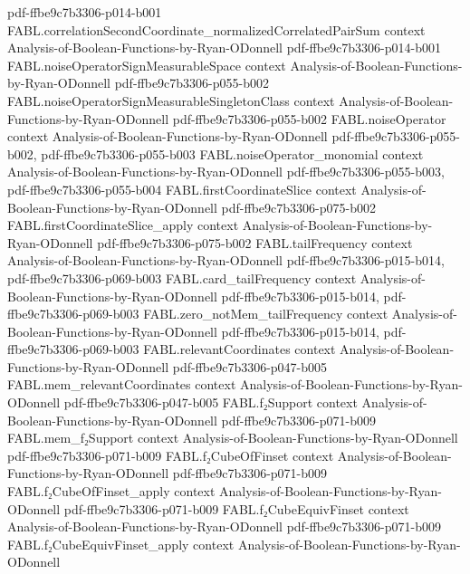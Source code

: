 \begin{theorem}
  {pdf-ffbe9c7b3306-p014-b001}
\proofstep
  {FABL.correlationSecondCoordinate_normalizedCorrelatedPairSum}
  {context}
  {Analysis-of-Boolean-Functions-by-Ryan-ODonnell}
  {pdf-ffbe9c7b3306-p014-b001}
\proofstep
  {FABL.noiseOperatorSignMeasurableSpace}
  {context}
  {Analysis-of-Boolean-Functions-by-Ryan-ODonnell}
  {pdf-ffbe9c7b3306-p055-b002}
\proofstep
  {FABL.noiseOperatorSignMeasurableSingletonClass}
  {context}
  {Analysis-of-Boolean-Functions-by-Ryan-ODonnell}
  {pdf-ffbe9c7b3306-p055-b002}
\proofstep
  {FABL.noiseOperator}
  {context}
  {Analysis-of-Boolean-Functions-by-Ryan-ODonnell}
  {pdf-ffbe9c7b3306-p055-b002,
    pdf-ffbe9c7b3306-p055-b003}
\proofstep
  {FABL.noiseOperator_monomial}
  {context}
  {Analysis-of-Boolean-Functions-by-Ryan-ODonnell}
  {pdf-ffbe9c7b3306-p055-b003,
    pdf-ffbe9c7b3306-p055-b004}
\proofstep
  {FABL.firstCoordinateSlice}
  {context}
  {Analysis-of-Boolean-Functions-by-Ryan-ODonnell}
  {pdf-ffbe9c7b3306-p075-b002}
\proofstep
  {FABL.firstCoordinateSlice_apply}
  {context}
  {Analysis-of-Boolean-Functions-by-Ryan-ODonnell}
  {pdf-ffbe9c7b3306-p075-b002}
\proofstep
  {FABL.tailFrequency}
  {context}
  {Analysis-of-Boolean-Functions-by-Ryan-ODonnell}
  {pdf-ffbe9c7b3306-p015-b014,
    pdf-ffbe9c7b3306-p069-b003}
\proofstep
  {FABL.card_tailFrequency}
  {context}
  {Analysis-of-Boolean-Functions-by-Ryan-ODonnell}
  {pdf-ffbe9c7b3306-p015-b014,
    pdf-ffbe9c7b3306-p069-b003}
\proofstep
  {FABL.zero_notMem_tailFrequency}
  {context}
  {Analysis-of-Boolean-Functions-by-Ryan-ODonnell}
  {pdf-ffbe9c7b3306-p015-b014,
    pdf-ffbe9c7b3306-p069-b003}
\proofstep
  {FABL.relevantCoordinates}
  {context}
  {Analysis-of-Boolean-Functions-by-Ryan-ODonnell}
  {pdf-ffbe9c7b3306-p047-b005}
\proofstep
  {FABL.mem_relevantCoordinates}
  {context}
  {Analysis-of-Boolean-Functions-by-Ryan-ODonnell}
  {pdf-ffbe9c7b3306-p047-b005}
\proofstep
  {FABL.f₂Support}
  {context}
  {Analysis-of-Boolean-Functions-by-Ryan-ODonnell}
  {pdf-ffbe9c7b3306-p071-b009}
\proofstep
  {FABL.mem_f₂Support}
  {context}
  {Analysis-of-Boolean-Functions-by-Ryan-ODonnell}
  {pdf-ffbe9c7b3306-p071-b009}
\proofstep
  {FABL.f₂CubeOfFinset}
  {context}
  {Analysis-of-Boolean-Functions-by-Ryan-ODonnell}
  {pdf-ffbe9c7b3306-p071-b009}
\proofstep
  {FABL.f₂CubeOfFinset_apply}
  {context}
  {Analysis-of-Boolean-Functions-by-Ryan-ODonnell}
  {pdf-ffbe9c7b3306-p071-b009}
\proofstep
  {FABL.f₂CubeEquivFinset}
  {context}
  {Analysis-of-Boolean-Functions-by-Ryan-ODonnell}
  {pdf-ffbe9c7b3306-p071-b009}
\proofstep
  {FABL.f₂CubeEquivFinset_apply}
  {context}
  {Analysis-of-Boolean-Functions-by-Ryan-ODonnell}

\end{theorem}
